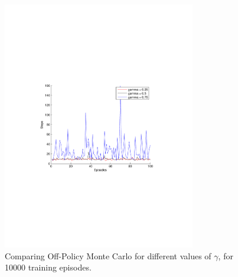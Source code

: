 \documentclass[a4paper,11pt]{article}
\begin{document}
~
\begin{figure}[h!]
  \centering
    \includegraphics[trim=4cm 8.5cm 4cm 8.5cm,clip,width=0.75\textwidth]{figures/offmc10000.pdf}
    \caption{Comparing Off-Policy Monte Carlo for different values of $\gamma$, for 10000 training episodes.}
    \label{offmc10000}
\end{figure}
\end{document}

